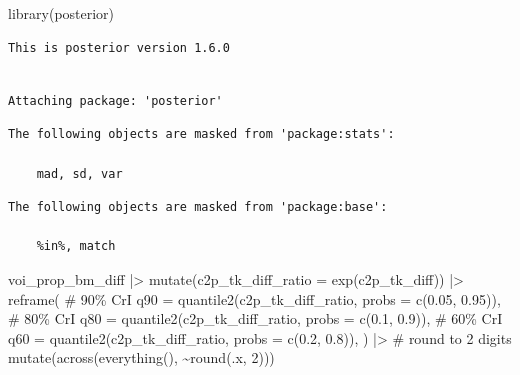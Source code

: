 \documentclass[
  authoryear,
  preprint,
  3p]{elsarticle}
\newenvironment{Shaded}{\begin{snugshade}}{\end{snugshade}}
\newcommand{\AttributeTok}[1]{\textcolor[rgb]{0.40,0.45,0.13}{#1}}
\newcommand{\CommentTok}[1]{\textcolor[rgb]{0.37,0.37,0.37}{#1}}
\newcommand{\DecValTok}[1]{\textcolor[rgb]{0.68,0.00,0.00}{#1}}
\newcommand{\FloatTok}[1]{\textcolor[rgb]{0.68,0.00,0.00}{#1}}
\newcommand{\FunctionTok}[1]{\textcolor[rgb]{0.28,0.35,0.67}{#1}}
\newcommand{\NormalTok}[1]{\textcolor[rgb]{0.00,0.23,0.31}{#1}}
\newcommand{\SpecialCharTok}[1]{\textcolor[rgb]{0.37,0.37,0.37}{#1}}
\begin{document}
\begin{Shaded}
\begin{Highlighting}[]
\FunctionTok{library}\NormalTok{(posterior)}
\end{Highlighting}
\end{Shaded}

\begin{verbatim}
This is posterior version 1.6.0
\end{verbatim}

\begin{verbatim}

Attaching package: 'posterior'
\end{verbatim}

\begin{verbatim}
The following objects are masked from 'package:stats':

    mad, sd, var
\end{verbatim}

\begin{verbatim}
The following objects are masked from 'package:base':

    %in%, match
\end{verbatim}

\begin{Shaded}
\begin{Highlighting}[]
\NormalTok{voi\_prop\_bm\_diff }\SpecialCharTok{|\textgreater{}} 
  \FunctionTok{mutate}\NormalTok{(}\AttributeTok{c2p\_tk\_diff\_ratio =} \FunctionTok{exp}\NormalTok{(c2p\_tk\_diff)) }\SpecialCharTok{|\textgreater{}} 
  \FunctionTok{reframe}\NormalTok{(}
    \CommentTok{\# 90\% CrI}
    \AttributeTok{q90 =} \FunctionTok{quantile2}\NormalTok{(c2p\_tk\_diff\_ratio, }\AttributeTok{probs =} \FunctionTok{c}\NormalTok{(}\FloatTok{0.05}\NormalTok{, }\FloatTok{0.95}\NormalTok{)),}
    \CommentTok{\# 80\% CrI}
    \AttributeTok{q80 =} \FunctionTok{quantile2}\NormalTok{(c2p\_tk\_diff\_ratio, }\AttributeTok{probs =} \FunctionTok{c}\NormalTok{(}\FloatTok{0.1}\NormalTok{, }\FloatTok{0.9}\NormalTok{)),}
    \CommentTok{\# 60\% CrI}
    \AttributeTok{q60 =} \FunctionTok{quantile2}\NormalTok{(c2p\_tk\_diff\_ratio, }\AttributeTok{probs =} \FunctionTok{c}\NormalTok{(}\FloatTok{0.2}\NormalTok{, }\FloatTok{0.8}\NormalTok{)),}
\NormalTok{  ) }\SpecialCharTok{|\textgreater{}} 
  \CommentTok{\# round to 2 digits}
  \FunctionTok{mutate}\NormalTok{(}\FunctionTok{across}\NormalTok{(}\FunctionTok{everything}\NormalTok{(), }\SpecialCharTok{\textasciitilde{}}\FunctionTok{round}\NormalTok{(.x, }\DecValTok{2}\NormalTok{)))}
\end{Highlighting}
\end{Shaded}
\end{document}
